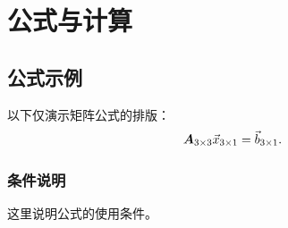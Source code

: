 \chapter{公式与计算}
\label{chap:chapter4}

\section{公式示例}
以下仅演示矩阵公式的排版：
\begin{equation}
  \bm{A}_{3\times 3}\vec{x}_{3\times 1}=\vec{b}_{3\times 1}.
  \label{eq:linear-model}
\end{equation}

\subsection{条件说明}
这里说明公式的使用条件。
